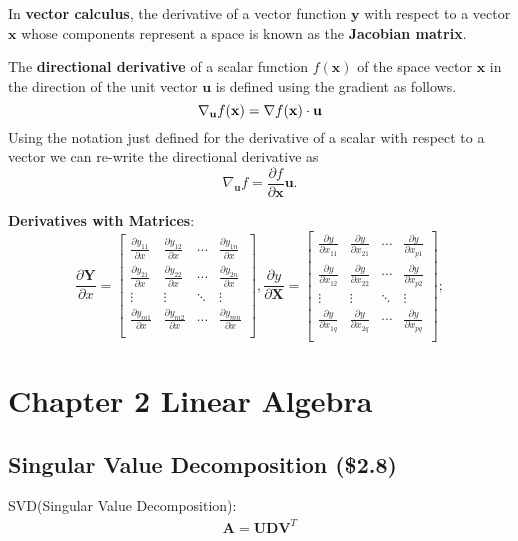 \documentclass[12pt]{article}
\numberwithin{equation}{section}
\begin{document}
In \textbf{vector calculus}, the derivative of a vector function $\mathbf{y}$ with respect to a vector $\mathbf{x}$ whose components represent a space is known as the \textbf{Jacobian matrix}.

The \textbf{directional derivative} of a scalar function $f(\mathbf{x})$ of the space vector $\mathbf{x}$ in the direction of the unit vector $\mathbf{u}$ is defined using the gradient as follows.
\[\nabla_{\bold{u}}{f}(\bold{x}) = \nabla f(\bold{x}) \cdot \bold{u}\]
Using the notation just defined for the derivative of a scalar with respect to a vector we can re-write the directional derivative as
\[\nabla_\mathbf{u} f = \frac{\partial f}{\partial \mathbf{x}}\mathbf{u}.\]

\textbf{Derivatives with Matrices}:
\[
\frac{\partial \mathbf{Y}}{\partial x} =
\begin{bmatrix}
\frac{\partial y_{11}}{\partial x} & \frac{\partial y_{12}}{\partial x} & \cdots & \frac{\partial y_{1n}}{\partial x}\\
\frac{\partial y_{21}}{\partial x} & \frac{\partial y_{22}}{\partial x} & \cdots & \frac{\partial y_{2n}}{\partial x}\\
\vdots & \vdots & \ddots & \vdots\\
\frac{\partial y_{m1}}{\partial x} & \frac{\partial y_{m2}}{\partial x} & \cdots & \frac{\partial y_{mn}}{\partial x}\\
\end{bmatrix},
\frac{\partial y}{\partial \mathbf{X}} =
\begin{bmatrix}
\frac{\partial y}{\partial x_{11}} & \frac{\partial y}{\partial x_{21}} & \cdots & \frac{\partial y}{\partial x_{p1}}\\
\frac{\partial y}{\partial x_{12}} & \frac{\partial y}{\partial x_{22}} & \cdots & \frac{\partial y}{\partial x_{p2}}\\
\vdots & \vdots & \ddots & \vdots\\
\frac{\partial y}{\partial x_{1q}} & \frac{\partial y}{\partial x_{2q}} & \cdots & \frac{\partial y}{\partial x_{pq}}\\
\end{bmatrix};
\]
\section{Chapter 2 Linear Algebra}
\subsection{Singular Value Decomposition (\$2.8)}
SVD(Singular Value Decomposition):
\begin{align*}
\mathbf{A=UDV}^{T}
\end{align*}
\end{document}
